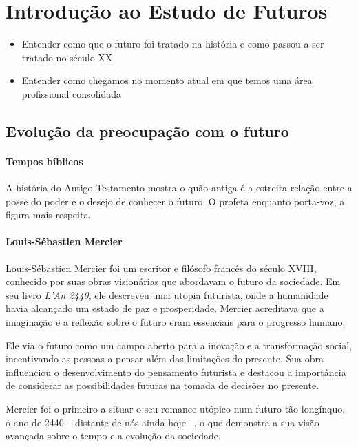 \pagebreak
\section{Introdução ao Estudo de Futuros}

\begin{slidecontent}
\begin{itemize}[leftmargin=*]
    \item Entender como que o futuro foi tratado na história e como passou a ser tratado no século XX
    \item Entender como chegamos no momento atual em que temos uma área profissional consolidada
\end{itemize}
\end{slidecontent}

\subsection{Evolução da preocupação com o futuro}


\paragraph{Tempos bíblicos}
A história do Antigo Testamento mostra o quão antiga é a estreita relação entre a posse do poder e o desejo de conhecer o futuro.
O profeta enquanto porta-voz, a figura mais respeita.

\paragraph{Louis-Sébastien Mercier}

Louis-Sébastien Mercier foi um escritor e filósofo francês do século XVIII, conhecido por suas obras visionárias que abordavam o futuro da sociedade. Em seu livro \textit{L'An 2440}, ele descreveu uma utopia futurista, onde a humanidade havia alcançado um estado de paz e prosperidade. Mercier acreditava que a imaginação e a reflexão sobre o futuro eram essenciais para o progresso humano.

Ele via o futuro como um campo aberto para a inovação e a transformação social, incentivando as pessoas a pensar além das limitações do presente. Sua obra influenciou o desenvolvimento do pensamento futurista e destacou a importância de considerar as possibilidades futuras na tomada de decisões no presente.

Mercier foi o primeiro a situar o seu romance utópico num futuro tão longínquo, o ano de 2440 -- distante de nós ainda hoje --, o que demonstra a sua visão avançada sobre o tempo e a evolução da sociedade.


